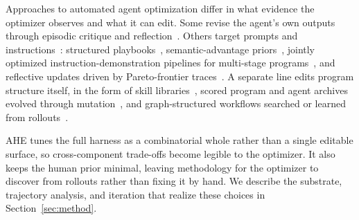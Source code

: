 Approaches to automated agent optimization differ in what evidence the optimizer observes and what it can edit.
Some revise the agent's own outputs through episodic critique and reflection~\citep{madaanSelfRefineIterativeRefinement2023c,shinnReflexionLanguageAgents2023c,guoCritiQMiningData2025}.
Others target prompts and instructions~\citep{khattabDSPyCompilingDeclarative2023}: structured playbooks~\citep{zhangAgenticContextEngineering2025a}, semantic-advantage priors~\citep{caiTrainingFreeGroupRelative2025}, jointly optimized instruction-demonstration pipelines for multi-stage programs~\citep{opsahl-ongOptimizingInstructionsDemonstrations2024a}, and reflective updates driven by Pareto-frontier traces~\citep{agrawalGEPAReflectivePrompt2025a}.
A separate line edits program structure itself, in the form of skill libraries~\citep{wangVoyagerOpenEndedEmbodied2023a}, scored program and agent archives evolved through mutation~\citep{novikovAlphaEvolveCodingAgent2025a,huAutomatedDesignAgentic2024}, and graph-structured workflows searched or learned from rollouts~\citep{zhangAFlowAutomatingAgentic2024,zhouSymbolicLearningEnables2024a}.

AHE tunes the full harness as a combinatorial whole rather than a single editable surface, so cross-component trade-offs become legible to the optimizer.
It also keeps the human prior minimal, leaving methodology for the optimizer to discover from rollouts rather than fixing it by hand.
We describe the substrate, trajectory analysis, and iteration that realize these choices in Section~\ref{sec:method}.
